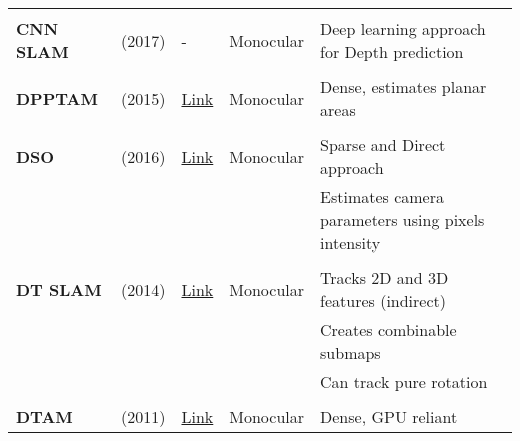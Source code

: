 {\begin{longtable}{l|l|l|l|l}
			&                                   &                                                                    &                       &\\
			\textbf{CNN SLAM}      & \cite{Tateno2017} (2017)          & -                                                                  & Monocular             & Deep learning approach for Depth prediction\\
			&                                   &                                                                    &                       &\\
			\textbf{DPPTAM}        & \cite{Concha2015b} (2015)         & {\href{https://github.com/alejocb/dpptam}{Link}}                   & Monocular             & Dense, estimates planar areas\\
			&                                   &                                                                    &                       &\\
			\textbf{DSO}           & \cite{Engel-et-al-pami2018} (2016)           & {\href{https://github.com/JakobEngel/dso}{Link}}                   & Monocular             & Sparse and Direct approach\\
			&                                   &                                                                    &                       & Estimates camera parameters using pixels intensity\\
			&                                   &                                                                    &                       &\\
			\textbf{DT SLAM}       & \cite{Daniel2014} (2014)          & {\href{https://github.com/plumonito/dtslam}{Link}}                 & Monocular             & Tracks 2D and 3D features (indirect)\\
			&                                   &                                                                    &                       & Creates combinable submaps\\
			&                                   &                                                                    &                       & Can track pure rotation\\
			&                                   &                                                                    &                       &\\
			\textbf{DTAM}          & \cite{Newcombe2011} (2011)        & {\href{https://github.com/anuranbaka/OpenDTAM}{Link}}              & Monocular             & Dense, GPU reliant\\

\end{longtable}}
